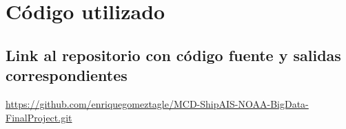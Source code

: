 \documentclass[10pt]{article}
\begin{document}
\section{Código utilizado}
\subsection{Link al repositorio con código fuente y salidas correspondientes}
\url{https://github.com/enriquegomeztagle/MCD-ShipAIS-NOAA-BigData-FinalProject.git}
\end{document}
